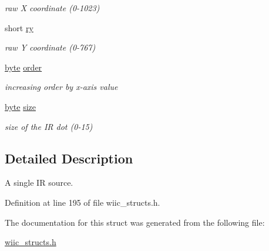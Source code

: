 \begin{DoxyCompactItemize}
\begin{DoxyCompactList}\small\item\em raw \-X coordinate (0-\/1023) \end{DoxyCompactList}\item 
\hypertarget{structir__dot__t_ab7fb2aacd27c03155935515907b49065}{short \hyperlink{structir__dot__t_ab7fb2aacd27c03155935515907b49065}{ry}}\label{structir__dot__t_ab7fb2aacd27c03155935515907b49065}

\begin{DoxyCompactList}\small\item\em raw \-Y coordinate (0-\/767) \end{DoxyCompactList}\item 
\hypertarget{structir__dot__t_a729a0f66a1b6ed5ec6caf999934ef44b}{\hyperlink{wiic__macros_8h_a0c8186d9b9b7880309c27230bbb5e69d}{byte} \hyperlink{structir__dot__t_a729a0f66a1b6ed5ec6caf999934ef44b}{order}}\label{structir__dot__t_a729a0f66a1b6ed5ec6caf999934ef44b}

\begin{DoxyCompactList}\small\item\em increasing order by x-\/axis value \end{DoxyCompactList}\item 
\hypertarget{structir__dot__t_a009422c74d8c2a1dcfe64e669cb7aa91}{\hyperlink{wiic__macros_8h_a0c8186d9b9b7880309c27230bbb5e69d}{byte} \hyperlink{structir__dot__t_a009422c74d8c2a1dcfe64e669cb7aa91}{size}}\label{structir__dot__t_a009422c74d8c2a1dcfe64e669cb7aa91}

\begin{DoxyCompactList}\small\item\em size of the \-I\-R dot (0-\/15) \end{DoxyCompactList}\end{DoxyCompactItemize}


\subsection{\-Detailed \-Description}
\-A single \-I\-R source. 

\-Definition at line 195 of file wiic\-\_\-structs.\-h.



\-The documentation for this struct was generated from the following file\-:\begin{DoxyCompactItemize}
\item 
\hyperlink{wiic__structs_8h}{wiic\-\_\-structs.\-h}\end{DoxyCompactItemize}
